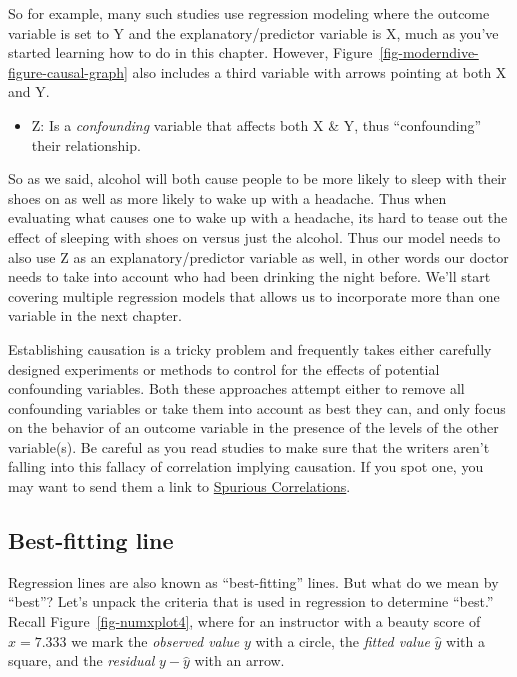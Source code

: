 \documentclass[
  letterpaper,
  DIV=11,
  numbers=noendperiod]{scrreprt}
\providecommand{\tightlist}{%
  \setlength{\itemsep}{0pt}\setlength{\parskip}{0pt}}\usepackage{longtable,booktabs,array}
\theoremstyle{definition}
\theoremstyle{remark}
\begin{document}
So for example, many such studies use regression modeling where the
outcome variable is set to Y and the explanatory/predictor variable is
X, much as you've started learning how to do in this chapter. However,
Figure~\ref{fig-moderndive-figure-causal-graph} also includes a third
variable with arrows pointing at both X and Y.

\begin{itemize}
\tightlist
\item
  Z: Is a \emph{confounding} variable that affects both X \& Y, thus
  ``confounding'' their relationship.
\end{itemize}

So as we said, alcohol will both cause people to be more likely to sleep
with their shoes on as well as more likely to wake up with a headache.
Thus when evaluating what causes one to wake up with a headache, its
hard to tease out the effect of sleeping with shoes on versus just the
alcohol. Thus our model needs to also use Z as an explanatory/predictor
variable as well, in other words our doctor needs to take into account
who had been drinking the night before. We'll start covering multiple
regression models that allows us to incorporate more than one variable
in the next chapter.

Establishing causation is a tricky problem and frequently takes either
carefully designed experiments or methods to control for the effects of
potential confounding variables. Both these approaches attempt either to
remove all confounding variables or take them into account as best they
can, and only focus on the behavior of an outcome variable in the
presence of the levels of the other variable(s). Be careful as you read
studies to make sure that the writers aren't falling into this fallacy
of correlation implying causation. If you spot one, you may want to send
them a link to
\href{http://www.tylervigen.com/spurious-correlations}{Spurious
Correlations}.

\hypertarget{sec-leastsquares}{%
\subsection{Best-fitting line}\label{sec-leastsquares}}

Regression lines are also known as ``best-fitting'' lines. But what do
we mean by ``best''? Let's unpack the criteria that is used in
regression to determine ``best.'' Recall Figure~\ref{fig-numxplot4},
where for an instructor with a beauty score of \(x = 7.333\) we mark the
\emph{observed value} \(y\) with a circle, the \emph{fitted value}
\(\widehat{y}\) with a square, and the \emph{residual}
\(y - \widehat{y}\) with an arrow.
\end{document}
